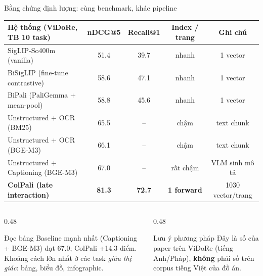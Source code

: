 \documentclass[aspectratio=169,10pt]{beamer}
\newcommand{\good}[1]{\textcolor{mathgreen}{\textbf{#1}}}
\begin{document}
\begin{frame}{Bằng chứng định lượng: cùng benchmark, khác pipeline}
  \centering
  \footnotesize
  \begin{tabular}{@{}lcccc@{}}
    \toprule
    Hệ thống (ViDoRe, TB 10 task) & nDCG@5 & Recall@1 & Index / trang & Ghi chú \\
    \midrule
    SigLIP-So400m (vanilla)              & 51.4 & 39.7 & nhanh & 1 vector \\
    BiSigLIP (fine-tune contrastive)     & 58.6 & 47.1 & nhanh & 1 vector \\
    BiPali (PaliGemma + mean-pool)       & 58.8 & 45.6 & nhanh & 1 vector \\
    \midrule
    Unstructured + OCR (BM25)            & 65.5 & --   & chậm  & text chunk \\
    Unstructured + OCR (BGE-M3)          & 66.1 & --   & chậm  & text chunk \\
    Unstructured + Captioning (BGE-M3)   & 67.0 & --   & rất chậm & VLM sinh mô tả \\
    \midrule
    \textbf{ColPali (late interaction)}  & \good{81.3} & \good{72.7} & \good{1 forward} & 1030 vector/trang \\
    \bottomrule
  \end{tabular}

  \vspace{4mm}
  \begin{columns}[T]
    \begin{column}{0.48\textwidth}
      \begin{block}{\small Đọc bảng}
        \footnotesize
        Baseline mạnh nhất (Captioning + BGE-M3) đạt 67.0; ColPali +14.3 điểm.
        Khoảng cách lớn nhất ở các task \emph{giàu thị giác}: bảng, biểu đồ, infographic.
      \end{block}
    \end{column}
    \begin{column}{0.48\textwidth}
      \begin{block}{\small Lưu ý phương pháp}
        \footnotesize
        Đây là số của paper trên ViDoRe (tiếng Anh/Pháp), \textbf{không} phải số trên corpus tiếng Việt của đồ án.
      \end{block}
    \end{column}
  \end{columns}
\end{frame}
\end{document}
